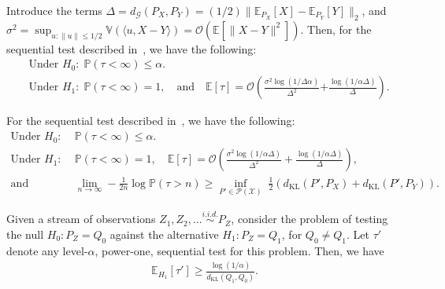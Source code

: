 \documentclass[10pt,a4paper]{amsart}
\newcommand{\X}{\mathcal{X}}
\newcommand{\dG}{d_{\mc{G}}}
\newcommand{\dkl}{d_{\mathrm{KL}}}
\newcommand{\iid}{i.i.d.\xspace}
\newcommand{\lp}{\left (} %
\newcommand{\mc}[1]{\mathcal{#1}}
\newcommand{\rp}{\right )} %
\begin{document}
    \begin{proposition}
    \label{prop:bounded-mean}
        Introduce the terms $\Delta = \dG(P_X, P_Y) =  (1/2)\|\mathbb{E}_{P_X}[X] - \mathbb{E}_{P_Y}[Y] \|_2$,  and  $\sigma^2 = \sup_{u:\|u\|\leq 1/2} \mathbb{V}\lp \langle u, X-Y\rangle \rp = \mc{O}\lp \mathbb{E}[\|X-Y\|^2]\rp$. Then, for the sequential test described in~, we have the following: 
        \begin{align}
            &\text{Under } H_0: \; \mathbb{P}(\tau < \infty) \leq \alpha. \\
            &\text{Under } H_1: \; \mathbb{P} \lp \tau <\infty \rp = 1, \quad \text{and} \quad \mathbb{E}[\tau] = \mc{O} \lp \frac{ \sigma^2 \log(1/\Delta \alpha) }{\Delta^2}  {+ \frac{\log(1/\alpha\Delta)}{\Delta}}\rp. \label{eq:tau-bounded-mean-1}
        \end{align}
    \end{proposition}

            \begin{proposition}
            \label{prop:kernel-mmd}
                For the sequential test described in~, we have the following: 
                \begin{align}
                    \text{Under } H_0: \; &\mathbb{P}(\tau < \infty) \leq \alpha. \\
                    \text{Under } H_1: \; &\mathbb{P} \lp \tau <\infty \rp = 1,  \quad \mathbb{E}[\tau] = \mc{O}\lp  \frac{\sigma^2  \log(1/\alpha \Delta)}{\Delta^2}  +{\frac{\log(1/\alpha \Delta)}{\Delta}}\rp,  \\ 
                    \text{and} \quad &\lim_{n \to \infty} -\frac{1}{2n} \log   \mathbb{P} \lp \tau > n \rp   \geq \inf_{P' \in \mc{P}(\X)} \; \frac{1}{2} \lp \dkl\lp P', P_X \rp + \dkl \lp P', P_Y \rp \rp. 
                \end{align}
            \end{proposition}

        \begin{lemma}
            \label{lemma:lower-bound-general} Given a stream of observations $Z_1, Z_2, \ldots \stackrel{\iid}{\sim} P_Z$, consider the problem of testing the null $H_0: P_Z = Q_0$ against the alternative $H_1: P_Z = Q_1$, for $Q_0 \neq Q_1$. Let $\tau'$ denote any level-$\alpha$, power-one, sequential test for this problem. Then, we have 
            \begin{align}
                \mathbb{E}_{H_1}[\tau'] \geq \frac{\log(1/\alpha)}{\dkl(Q_1, Q_0)}. 
            \end{align}
        \end{lemma}
\end{document}

